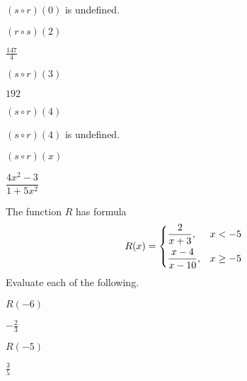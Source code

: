\begin{exercises}
\begin{problem}[Composition]
\begin{multicols}{3}
\begin{subproblem}
\begin{shortsolution}
       $(s\circ r)(0)$ is undefined.
        \end{shortsolution}
    \end{subproblem}
    \begin{subproblem}
   $(r\circ s)(2)$ 
        \begin{shortsolution}
         $\frac{147}{4}$ 
        \end{shortsolution}
    \end{subproblem}
    \begin{subproblem}
   $(s\circ r)(3)$ 
        \begin{shortsolution}
        $192$ 
        \end{shortsolution}
    \end{subproblem}
    \begin{subproblem}
   $(s\circ r)(4)$ 
        \begin{shortsolution}
        $(s\circ r)(4)$ is undefined.
        \end{shortsolution}
    \end{subproblem}
    \begin{subproblem}
   $(s\circ r)(x)$ 
        \begin{shortsolution}
         $\dfrac{4x^2-3}{1+5x^2}$
        \end{shortsolution}
    \end{subproblem}
\end{multicols}
\end{problem}
\begin{problem}
The function $R$ has formula
\[
    R(x)=
    \begin{dcases}
     \frac{2}{x+3}, & x<-5\\
     \frac{x-4}{x-10}, & x\geq -5
    \end{dcases}
\]
Evaluate each of the following.
\begin{multicols}{4}
    \begin{subproblem}
        $R(-6)$    
        \begin{shortsolution}
         $-\frac{2}{3}$ 
        \end{shortsolution}
    \end{subproblem}
    \begin{subproblem}
   $R(-5)$ 
        \begin{shortsolution}
         $\frac{3}{5}$ 
        \end{shortsolution}

\end{subproblem}
\end{multicols}
\end{problem}
\end{exercises}
